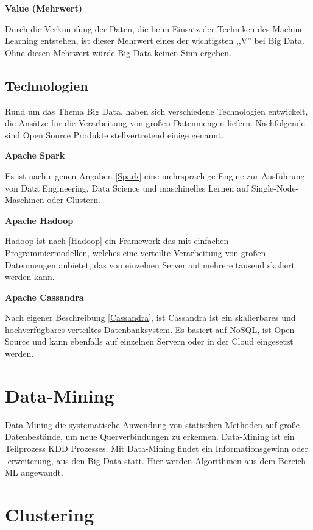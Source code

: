 \textbf{Value (Mehrwert)}\vspace{0.2cm}

Durch die Verknüpfung der Daten, die beim Einsatz der Techniken des Machine Learning entstehen, ist dieser Mehrwert eines der wichtigsten ,,V'' bei Big Data. Ohne diesen Mehrwert würde Big Data keinen Sinn ergeben.

\subsection{Technologien}
Rund um das Thema Big Data, haben sich verschiedene Technologien entwickelt, die Ansätze für die Verarbeitung von großen Datenmengen liefern. Nachfolgende sind Open Source Produkte stellvertretend einige genannt.\vspace{0.2cm}

\textbf{Apache Spark}\vspace{0.2cm}

Es ist nach eigenen Angaben [\href{https://spark.apache.org}{Spark}] eine mehrsprachige Engine zur Ausführung von Data Engineering, Data Science und maschinelles Lernen auf Single-Node-Maschinen oder Clustern.\vspace{0.5cm}

\textbf{Apache Hadoop}\vspace{0.2cm}

Hadoop ist nach [\href{https://hadoop.apache.org}{Hadoop}] ein Framework das mit einfachen Programmiermodellen, welches eine verteilte Verarbeitung von großen Datenmengen anbietet, das von einzelnen Server auf mehrere tausend skaliert werden kann.\vspace{0.5cm}

\textbf{Apache Cassandra}\vspace{0.2cm}

Nach eigener Beschreibung [\href{https://cassandra.apache.org}{Cassandra}], ist Cassandra ist ein skalierbares und hochverfügbares verteiltes Datenbanksystem. Es basiert auf NoSQL, ist Open-Source und kann ebenfalls auf einzelnen Servern oder in der Cloud eingesetzt werden.

\section{Data-Mining}
Data-Mining die systematische Anwendung von statischen Methoden auf große Datenbestände, um neue Querverbindungen zu erkennen. Data-Mining ist ein Teilprozess KDD Prozesses. Mit Data-Mining findet ein Informationsgewinn oder -erweiterung, aus den Big Data statt. Hier werden Algorithmen aus dem Bereich ML angewandt.

\section{Clustering}
